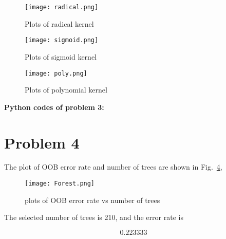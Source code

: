 \documentclass{article}
\begin{document}
\begin{figure}[!hbp]
    		\texttt{[image: radical.png]}
		\centering
		\caption{Plots of radical kernel}
		\label{radical}
    		\end{figure}
				\begin{figure}[!hbp]
    		\texttt{[image: sigmoid.png]}
		\centering
		\caption{Plots of sigmoid kernel}
		\label{sigmoid}
    		\end{figure}

				\begin{figure}[h]
    		\texttt{[image: poly.png]}
		\centering
		\caption{Plots of polynomial kernel}
		\label{poly}
    		\end{figure}

\newpage
\textbf{Python codes of problem 3:}

				
\section{Problem 4}
The plot of OOB error rate and number of trees are shown in Fig.~\ref{forest}, 
\begin{figure}[!hbp]
    		\texttt{[image: Forest.png]}
		\centering
		\caption{plots of OOB error rate vs number of trees}
		\label{forest}
    		\end{figure}

The selected number of trees is 210, and the error rate is 

	\begin{equation}
				0.223333
				\end{equation}
\end{document}
